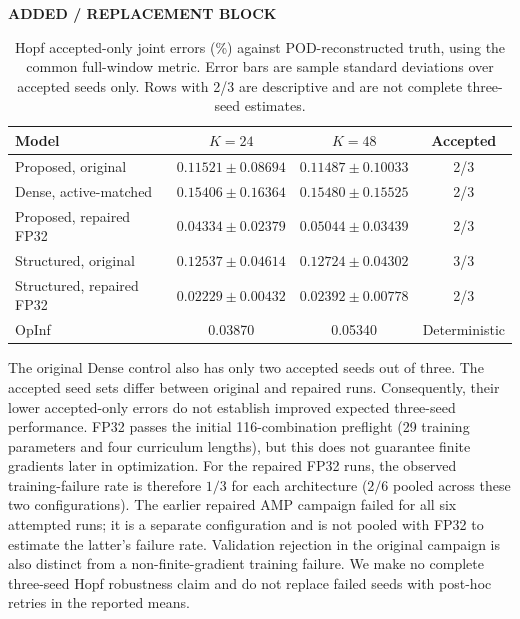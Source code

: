 \documentclass{article}
\providecommand{\DIFaddtex}[1]{{\protect\color{blue} \sf #1}} %
\providecommand{\DIFaddbegin}{} %
\providecommand{\DIFadd}[1]{\texorpdfstring{\DIFaddtex{#1}}{#1}} %
\begin{document}
\DIFaddbegin 
{\color{blue}
\begin{table}[H]
\color{blue}\noindent\textbf{ADDED / REPLACEMENT BLOCK}\par
\centering
\caption{Hopf accepted-only joint errors (\%) against POD-reconstructed
truth, using the common full-window metric. Error bars are sample
standard deviations over accepted seeds only. Rows with 2/3 are
descriptive and are not complete three-seed estimates.}
\label{tab:hopf_accepted}
\small
\begin{tabular}{@{}lccc@{}}
\toprule
Model & $K=24$ & $K=48$ & Accepted\\
\midrule
Proposed, original & $0.11521\pm0.08694$ & $0.11487\pm0.10033$ & 2/3\\
Dense, active-matched & $0.15406\pm0.16364$ & $0.15480\pm0.15525$ & 2/3\\
Proposed, repaired FP32 & $0.04334\pm0.02379$ & $0.05044\pm0.03439$ & 2/3\\
Structured, original & $0.12537\pm0.04614$ & $0.12724\pm0.04302$ & 3/3\\
Structured, repaired FP32 & $0.02229\pm0.00432$ & $0.02392\pm0.00778$ & 2/3\\
OpInf & 0.03870 & 0.05340 & Deterministic\\
\bottomrule
\end{tabular}
\end{table}
}




\DIFadd{The original Dense control also has only two accepted seeds out of three.
The accepted seed sets differ between original and repaired runs.
Consequently, their lower accepted-only errors do not establish improved
expected three-seed performance. FP32 passes the initial 116-combination
preflight (29 training parameters and four curriculum lengths), but this
does not guarantee finite gradients later in optimization.
For the repaired FP32 runs, the observed training-failure rate is therefore
$1/3$ for each architecture ($2/6$ pooled across these two configurations).
The earlier repaired AMP campaign failed for all six attempted runs;
it is a separate configuration and is not pooled with FP32 to estimate
the latter's failure rate. Validation rejection in the original campaign
is also distinct from a non-finite-gradient training failure. We make no
complete three-seed Hopf robustness claim and do not replace failed seeds
with post-hoc retries in the reported means.
}
\end{document}
